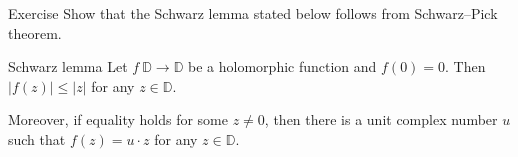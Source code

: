 \begin{thm}{Exercise}\label{ex:schwarz}
Show that the Schwarz lemma stated below 
follows from Schwarz--Pick theorem.
\end{thm}

\begin{thm}{Schwarz lemma}
Let $f\: \mathbb{D}\to \mathbb{D}$ be a holomorphic function
and $f(0)=0$.
Then 
$|f(z)|\le |z|$
for any $z\in \mathbb{D}$.

Moreover, if equality holds for some $z\ne 0$, then there is a unit complex number $u$ 
such that 
$f(z)=u\cdot z$
for any $z\in\mathbb{D}$.
\end{thm}






